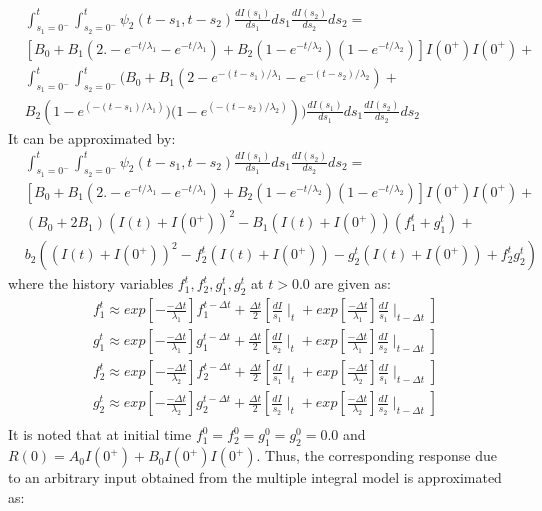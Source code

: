 \begin{equation}
\begin{aligned}
& \int_{s_1=0^{-}}^{t}\int_{s_2=0^{-}}^{t}\psi_2(t-s_1,t-s_2) \frac{dI(s_1)}{ds_1}ds_1 \frac{dI(s_2)}{ds_2}ds_2 =\\
& [B_0+B_1(2.-e^{-t/\lambda_1} -e^{-t/\lambda_1} ) +B_2 (1-e^{-t/\lambda_2}) (1-e^{-t/\lambda_2}) ]I(0^+)I(0^+)+ \\
& \int_{s_1=0^{-}}^{t}\int_{s_2=0^{-}}^{t}  \Big( B_0+B_1  \left(2-e^{-(t-s_1)/\lambda_1}-e^{-(t-s_2)/\lambda_2}\right)+ \\
& B_2\left(1-e^{(-(t-s_1)/\lambda_1)})(1-e^{(-(t-s_2)/\lambda_2)}\right) \Big)
 \frac{dI(s_1)}{ds_1}ds_1 \frac{dI(s_2)}{ds_2}ds_2 
\end{aligned}
\label{EQN_2.23:double_integral_expand_rewrited}
\end{equation}
It can be approximated by:
\begin{equation}
\begin{aligned}
& \int_{s_1=0^{-}}^{t}\int_{s_2=0^{-}}^{t}\psi_2(t-s_1,t-s_2) \frac{dI(s_1)}{ds_1}ds_1 \frac{dI(s_2)}{ds_2}ds_2 =\\
& [B_0+B_1(2.-e^{-t/\lambda_1} -e^{-t/\lambda_1} ) +B_2 (1-e^{-t/\lambda_2}) (1-e^{-t/\lambda_2}) ]I(0^+)I(0^+)+ \\
& (B_0+2B_1)( I(t)+I(0^+) )^2-B_1(I(t)+I(0^+))(f^t_1+g^t_1) +\\
& b_2( ( I(t)+I(0^+) )^2 -f^t_2( I(t)+I(0^+) )-g^t_2( I(t)+I(0^+) )+ f^t_2 g^t_2)
\end{aligned}
\label{2_24_EQN:double_integral_expand_approximated}
\end{equation}
where the history variables $f^t_1, f^t_2, g^t_1, g^t_2$ at $t>0.0$ are given as:
\begin{equation}
\begin{aligned}
& f^t_1 \approx  exp \left[-\frac{-\Delta t}{\lambda_1} \right] f^{t-\Delta t}_1+ \frac{\Delta t}{2} \left[  \frac{dI}{s_1} \mid_t+exp \left[ \frac{-\Delta t}{\lambda_1} \right]   \frac{dI}{s_1} \mid_{t-\Delta t} \right] \\
& g^t_1 \approx  exp \left[-\frac{-\Delta t}{\lambda_1} \right] g^{t-\Delta t}_1+ \frac{\Delta t}{2} \left[  \frac{dI}{s_2} \mid_t+exp \left[ \frac{-\Delta t}{\lambda_1} \right]   \frac{dI}{s_2} \mid_{t-\Delta t} \right] \\
& f^t_2 \approx  exp \left[-\frac{-\Delta t}{\lambda_2} \right] f^{t-\Delta t}_2+ \frac{\Delta t}{2} \left[  \frac{dI}{s_1} \mid_t+exp \left[ \frac{-\Delta t}{\lambda_2} \right]   \frac{dI}{s_1} \mid_{t-\Delta t} \right] \\
& g^t_2 \approx  exp \left[-\frac{-\Delta t}{\lambda_2} \right] g^{t-\Delta t}_2+ \frac{\Delta t}{2} \left[  \frac{dI}{s_2} \mid_t+exp \left[ \frac{-\Delta t}{\lambda_2} \right]   \frac{dI}{s_2} \mid_{t-\Delta t} \right] \\
\end{aligned} 
\label{2_25_EQN:double_integral_history_variables}
\end{equation}
It is noted that at initial time $f^0_1= f^0_2= g^0_1= g^0_2=0.0$ and $R(0)=A_0I(0^+)+B_0 I(0^+)I(0^+)$. 
Thus, the corresponding response due to an arbitrary input obtained from the multiple integral model is approximated as: 

